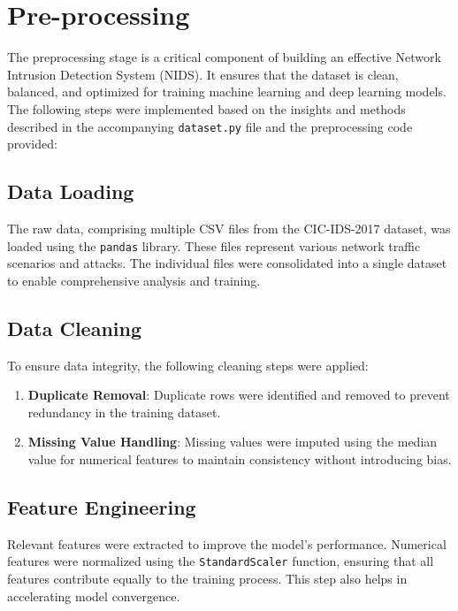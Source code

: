 \documentclass[conference]{IEEEtran}
\begin{document}
\section{Pre-processing}

The preprocessing stage is a critical component of building an effective Network Intrusion Detection System (NIDS). It ensures that the dataset is clean, balanced, and optimized for training machine learning and deep learning models. The following steps were implemented based on the insights and methods described in the accompanying \texttt{dataset.py} file and the preprocessing code provided:

\subsection{Data Loading}
The raw data, comprising multiple CSV files from the CIC-IDS-2017 dataset, was loaded using the \texttt{pandas} library. These files represent various network traffic scenarios and attacks. The individual files were consolidated into a single dataset to enable comprehensive analysis and training.

\subsection{Data Cleaning}
To ensure data integrity, the following cleaning steps were applied:
\begin{enumerate}[label=\roman*.]
    \item \textbf{Duplicate Removal}: Duplicate rows were identified and removed to prevent redundancy in the training dataset.
    \item \textbf{Missing Value Handling}: Missing values were imputed using the median value for numerical features to maintain consistency without introducing bias.
\end{enumerate}

\subsection{Feature Engineering}
Relevant features were extracted to improve the model's performance. Numerical features were normalized using the \texttt{StandardScaler} function, ensuring that all features contribute equally to the training process. This step also helps in accelerating model convergence.
\end{document}
